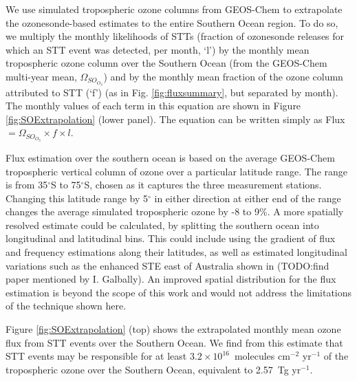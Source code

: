 \documentclass{article}
\begin{document}
  We use simulated tropospheric ozone columns from GEOS-Chem to extrapolate the ozonesonde-based estimates to the entire Southern Ocean region. 
  To do so, we multiply the monthly likelihoods of STTs (fraction of ozonesonde releases for which an STT event was detected, per month, `l') by the monthly mean tropospheric ozone column over the Southern Ocean (from the GEOS-Chem multi-year mean, $\Omega_{SO_{O_3}}$) and by the monthly mean fraction of the ozone column attributed to STT (`f') (as in Fig. \ref{fig:fluxsummary}, but separated by month).
  The monthly values of each term in this equation are shown in Figure \ref{fig:SOExtrapolation} (lower panel).
  The equation can be written simply as Flux$= \Omega_{SO_{O_3}} \times f \times l$.

  Flux estimation over the southern ocean is based on the average GEOS-Chem tropospheric vertical column of ozone over a particular latitude range.
  The range is from 35$^{\circ}$S to 75$^{\circ}$S, chosen as it captures the three measurement stations.
  Changing this latitude range by 5$^{\circ}$ in either direction at either end of the range changes the average simulated tropospheric ozone by -8 to 9\%.
  A more spatially resolved estimate could be calculated, by splitting the southern ocean into longitudinal and latitudinal bins.
  This could include using the gradient of flux and frequency estimations along their latitudes, as well as estimated longitudinal variations such as the enhanced STE east of Australia shown in (TODO:find paper mentioned by I. Galbally).
  An improved spatial distribution for the flux estimation is beyond the scope of this work and would not address the limitations of the technique shown here.
  
  Figure \ref{fig:SOExtrapolation} (top) shows the extrapolated monthly mean ozone flux from STT events over the Southern Ocean.
  We find from this estimate that STT events may be responsible for at least $3.2 \times10^{16}$~molecules cm$^{-2}$ yr$^{-1}$ of the tropospheric ozone over the Southern Ocean, equivalent to 2.57~Tg yr$^{-1}$.
    
\end{document}
